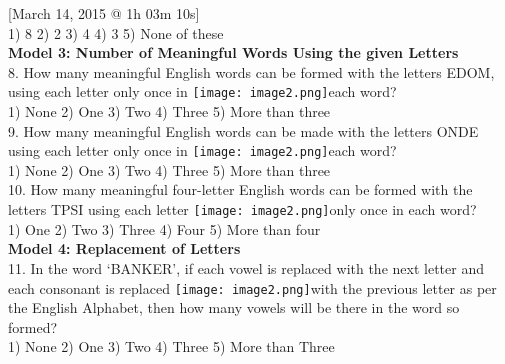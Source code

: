 \documentclass[
]{article}
\begin{document}
[March 14, 2015 @ 1h 03m 10s]\\
1) 8 \hspace{2mm}2) 2 \hspace{2mm}3) 4 \hspace{2mm}4) 3 \hspace{2mm}5) None of these\\

\textbf{Model 3: Number of Meaningful Words Using the given Letters}\\

8. How many meaningful English words can be formed with the letters EDOM, using each
letter only once in \texttt{[image: image2.png]}each word?\\
1) None \hspace{2mm}2) One \hspace{2mm}3) Two \hspace{2mm}4) Three \hspace{2mm}5) More than three\\

9. How many meaningful English words can be made with the letters ONDE using each letter
only once in \texttt{[image: image2.png]}each word?\\
1) None \hspace{2mm}2) One \hspace{2mm}3) Two \hspace{2mm}4) Three \hspace{2mm}5) More than three\\

10. How many meaningful four-letter English words can be formed with the letters TPSI using
each letter \texttt{[image: image2.png]}only once in each word?\\
1) One \hspace{2mm}2) Two \hspace{2mm}3) Three \hspace{2mm}4) Four \hspace{2mm}5) More than four\\

\textbf{Model 4: Replacement of Letters}\\

11. In the word ‘BANKER’, if each vowel is replaced with the next letter and each consonant is
replaced \texttt{[image: image2.png]}with the previous letter as per the English Alphabet, then how many vowels will
be there in the word so formed?\\
1) None \hspace{2mm}2) One \hspace{2mm}3) Two \hspace{2mm}4) Three \hspace{2mm}5) More than Three\\
\end{document}
